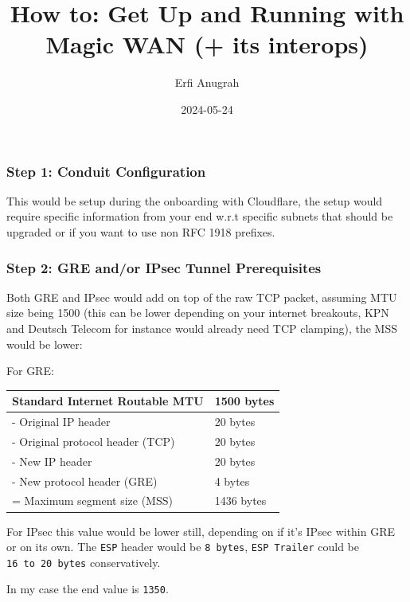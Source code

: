 \documentclass[
]{article}
\title{How to: Get Up and Running with Magic WAN (+ its interops)}
\author{Erfi Anugrah}
\date{2024-05-24}
\renewcommand*\contentsname{Table of contents}
\newcommand\contentsname{Table of contents}
\begin{document}
\maketitle

\renewcommand*\contentsname{Table of contents}
{
\hypersetup{linkcolor=}
\setcounter{tocdepth}{10}
\tableofcontents
}

\newpage{}

\subsubsection{Step 1: Conduit
Configuration}\label{step-1-conduit-configuration}

This would be setup during the onboarding with Cloudflare, the setup
would require specific information from your end w.r.t specific subnets
that should be upgraded or if you want to use non RFC 1918 prefixes.

\subsubsection{Step 2: GRE and/or IPsec Tunnel
Prerequisites}\label{step-2-gre-andor-ipsec-tunnel-prerequisites}

Both GRE and IPsec would add on top of the raw TCP packet, assuming MTU
size being 1500 (this can be lower depending on your internet breakouts,
KPN and Deutsch Telecom for instance would already need TCP clamping),
the MSS would be lower:

For GRE:

\begin{longtable}[]{@{}ll@{}}
\toprule\noalign{}
Standard Internet Routable MTU & 1500 bytes \\
\midrule\noalign{}
\endhead
\bottomrule\noalign{}
\endlastfoot
- Original IP header & 20 bytes \\
- Original protocol header (TCP) & 20 bytes \\
- New IP header & 20 bytes \\
- New protocol header (GRE) & 4 bytes \\
= Maximum segment size (MSS) & 1436 bytes \\
\end{longtable}

For IPsec this value would be lower still, depending on if it's IPsec
within GRE or on its own. The \texttt{ESP} header would be
\texttt{8\ bytes}, \texttt{ESP\ Trailer} could be
\texttt{16\ to\ 20\ bytes} conservatively.

In my case the end value is \texttt{1350}.
\end{document}
